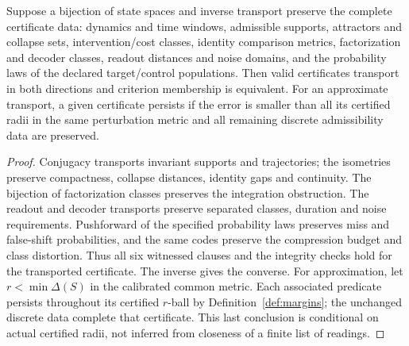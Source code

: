 \begin{proposition}\label{prop:grammar-transport-prediction}
Suppose a bijection of state spaces and inverse transport preserve the complete
certificate data: dynamics and time windows, admissible supports, attractors
and collapse sets, intervention/cost classes, identity comparison metrics,
factorization and decoder classes, readout distances and noise domains,
and the probability laws of the declared target/control populations.
Then valid certificates transport in both directions and criterion membership
is equivalent. For an approximate transport, a given certificate persists if
the error is smaller than all its certified radii in the same perturbation
metric and all remaining discrete admissibility data are preserved.
\end{proposition}
\begin{proof}
Conjugacy transports invariant supports and trajectories; the isometries
preserve compactness, collapse distances, identity gaps and continuity.
The bijection of factorization classes preserves the integration obstruction.
The readout and decoder transports preserve separated classes, duration and
noise requirements. Pushforward of the specified probability laws preserves
miss and false-shift probabilities, and the same codes preserve the compression
budget and class distortion. Thus all six witnessed clauses and the integrity
checks hold for the transported certificate. The inverse gives the converse.
For approximation, let $r<\min\Delta(S)$ in the calibrated common metric.
Each associated predicate persists throughout its certified $r$-ball by
Definition~\ref{def:margins}; the unchanged discrete data complete that certificate.
This last conclusion is conditional on actual certified radii, not inferred
from closeness of a finite list of readings.
\end{proof}

